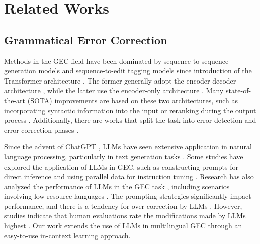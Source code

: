 \section{Related Works}
\subsection{Grammatical Error Correction}






Methods in the GEC field have been dominated by sequence-to-sequence generation models \cite{junczys-dowmunt-etal-2018-approaching, katsumata-komachi-2020-stronger} and sequence-to-edit tagging models \cite{omelianchuk-etal-2020-gector, lai-etal-2022-type} since introduction of the Transformer architecture \cite{vaswani2017attention}. The former generally adopt the encoder-decoder architecture \cite{lewis-etal-2020-bart}, while the latter use the encoder-only architecture \cite{devlin-etal-2019-bert}. Many state-of-the-art (SOTA) improvements are based on these two architectures, such as incorporating syntactic information into the input \cite{zhang-etal-2022-syngec} or reranking during the output process \cite{zhang-etal-2023-bidirectional, zhou-etal-2023-decoding-interventions}. Additionally, there are works that split the task into error detection and error correction phases  \cite{li-etal-2023-templategec, li-wang-2024-detection}.

Since the advent of ChatGPT \cite{brown2020gpt3}, LLMs have seen extensive application in natural language processing, particularly in text generation tasks \cite{li2024pre}. Some studies have explored the application of LLMs in GEC, such as constructing prompts for direct inference \cite{davis-etal-2024-prompting} and using parallel data for instruction tuning \cite{fan2023grammargpt, raheja-etal-2024-medit}. Research has also analyzed the performance of LLMs in the GEC task \cite{coyne2023analyzing}, including scenarios involving low-resource languages \cite{penteado2023evaluating, maeng-etal-2023-effectiveness}. The prompting strategies significantly impact performance, and there is a tendency for over-correction by LLMs \cite{loem-etal-2023-exploring, zeng-etal-2024-evaluating}. However, studies indicate that human evaluations rate the modifications made by LLMs highest \cite{coyne2023analyzing}. Our work extends the use of LLMs in multilingual GEC through an easy-to-use in-context learning approach.

